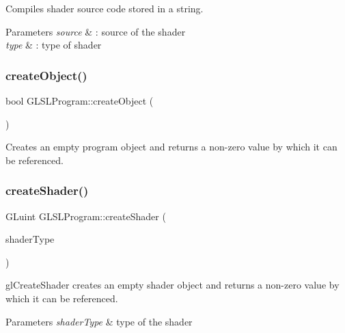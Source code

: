 Compiles shader source code stored in a string. 


\begin{DoxyParams}{Parameters}
{\em source} & \+: source of the shader \\
\hline
{\em type} & \+: type of shader \\
\hline
\end{DoxyParams}
\hypertarget{class_g_l_s_l_program_a07aaaf69f5837deb59a7551dc323f667}{}\label{class_g_l_s_l_program_a07aaaf69f5837deb59a7551dc323f667} 
\subsubsection{\texorpdfstring{create\+Object()}{createObject()}}
{\footnotesize\ttfamily bool G\+L\+S\+L\+Program\+::create\+Object (\begin{DoxyParamCaption}{ }\end{DoxyParamCaption})}

Creates an empty program object and returns a non-\/zero value by which it can be referenced. \hypertarget{class_g_l_s_l_program_ae4fe65254ed23ef5fba32dd4b7a3bee2}{}\label{class_g_l_s_l_program_ae4fe65254ed23ef5fba32dd4b7a3bee2} 
\subsubsection{\texorpdfstring{create\+Shader()}{createShader()}}
{\footnotesize\ttfamily G\+Luint G\+L\+S\+L\+Program\+::create\+Shader (\begin{DoxyParamCaption}\item[{G\+Lenum}]{shader\+Type }\end{DoxyParamCaption})}



gl\+Create\+Shader creates an empty shader object and returns a non-\/zero value by which it can be referenced. 


\begin{DoxyParams}{Parameters}
{\em shader\+Type} & type of the shader \\
\hline
\end{DoxyParams}
\hypertarget{class_g_l_s_l_program_a37f5a6e85135bc51ed4a94712bacde76}{}\label{class_g_l_s_l_program_a37f5a6e85135bc51ed4a94712bacde76} 
